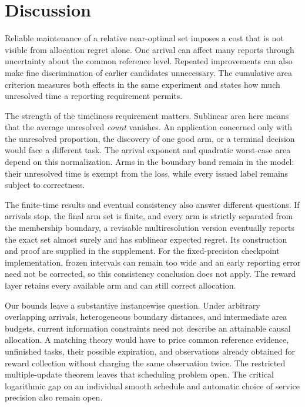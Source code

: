 \section{Discussion}
\label{sec:discussion}

Reliable maintenance of a relative near-optimal set imposes a cost that is
not visible from allocation regret alone. One arrival can affect many reports
through uncertainty about the common reference level. Repeated improvements
can also make fine discrimination of earlier candidates unnecessary. The
cumulative area criterion measures both effects in the same experiment
and states how much unresolved time a reporting requirement permits.

The strength of the timeliness requirement matters. Sublinear area here means
that the average unresolved \emph{count} vanishes. An application concerned
only with the unresolved proportion, the discovery of one good arm, or a
terminal decision would face a different task. The arrival exponent and
quadratic worst-case area depend on this normalization. Arms in the boundary
band remain in the model: their unresolved time is exempt from the loss, while
every issued label remains subject to correctness.

The finite-time results and eventual consistency also answer different
questions. If arrivals stop, the final arm set is finite, and every arm is
strictly separated from the membership boundary, a revisable multiresolution
version eventually reports the exact set almost surely and has sublinear
expected regret. Its construction and proof are supplied in the supplement.
For the fixed-precision checkpoint implementation, frozen intervals can remain
too wide and an early reporting error need not be corrected, so this consistency
conclusion does not apply. The reward layer retains every available arm and
can still correct allocation.

Our bounds leave a substantive instancewise question. Under arbitrary
overlapping arrivals, heterogeneous boundary distances, and intermediate area
budgets, current information constraints need not describe an attainable causal
allocation. A matching theory would have to price common reference evidence,
unfinished tasks, their possible expiration, and observations already obtained
for reward collection without charging the same observation twice. The
restricted multiple-update theorem leaves that scheduling problem open.
The critical logarithmic gap on an individual smooth schedule and automatic
choice of service precision also remain open.

